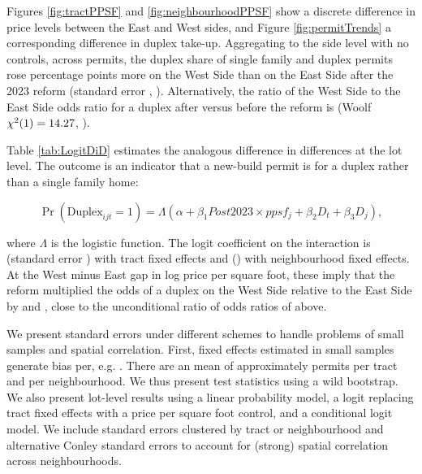 \documentclass[12pt]{article}
\begin{document}
\begin{table}
	\caption{\label{tab:shareDiDElasTable} Tract-level DiD as in \ref{tab:ShareDiD}, but with tract dummies dropped to separately observe level and interaction effects of price per square foot and two elasticities of price: with respect to built square footage (columns 2--3) and with respect to lot size (columns 4--5; Table \ref{tab:elasPpsf}). Columns 4--5 use the \lotElasNTract{} tracts with a lot size elasticity. Standard errors clustered by tract in parentheses; wild cluster restricted bootstrap $p$-values with Webb weights.}
	
\end{table}

Figures \ref{fig:tractPPSF} and \ref{fig:neighbourhoodPPSF} show a discrete difference in price levels between the East and West sides, and Figure \ref{fig:permitTrends} a corresponding difference in duplex take-up. Aggregating to the side level with no controls, across \ewN{} permits, the duplex share of single family and duplex permits rose \ewDiD{} percentage points more on the West Side than on the East Side after the 2023 reform (standard error \ewDiDSE, \ewDiDP). Alternatively, the ratio of the West Side to the East Side odds ratio for a duplex after versus before the reform is \ewOddsRatio{} (Woolf $\chi^{2}(1) = 14.27$, \ewChiSqP). 

Table \ref{tab:LogitDiD} estimates the analogous difference in differences at the lot level. The outcome is an indicator that a new-build permit is for a duplex rather than a single family home:

\begin{equation}
	\label{eq:LogitDiD}
	\Pr(\text{Duplex}_{ijt} = 1) = \Lambda\left(\alpha + \beta_{1} Post 2023 \times ppsf_{j} + \beta_{2}D_{t} + \beta_{3}D_{j}\right),
\end{equation}

where $\Lambda$ is the logistic function. The logit coefficient on the interaction is \lgTractFE{} (standard error \lgTractFESE) with tract fixed effects and \lgNbhdFE{} (\lgNbhdFESE) with neighbourhood fixed effects. At the West minus East gap in log price per square foot, these imply that the reform multiplied the odds of a duplex on the West Side relative to the East Side by \lgTractOR{} and \lgNbhdOR, close to the unconditional ratio of odds ratios of \ewOddsRatio{} above. 

We present standard errors under different schemes to handle problems of small samples and spatial correlation. First, fixed effects estimated in small samples generate bias per, e.g. \textcite{NeymanScott1948}. There are an mean of approximately \lgPermitsPerTract{} permits per tract and \lgPermitsPerNbhd{} per neighbourhood. We thus present test statistics using a wild bootstrap. We also present lot-level results using a linear probability model, a logit replacing tract fixed effects with a price per square foot control, and a conditional logit model. We include standard errors clustered by tract or neighbourhood and alternative Conley standard errors to account for (strong) spatial correlation across neighbourhoods.
\end{document}
